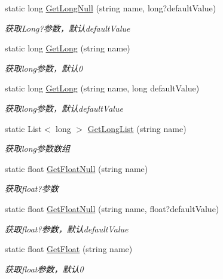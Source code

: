 \begin{DoxyCompactItemize}
static long \hyperlink{class_x_c_l_net_tools_1_1_string_hander_1_1_form_helper_a7e009fc6b804b15f2015d78ed3581677}{Get\-Long\-Null} (string name, long?default\-Value)
\begin{DoxyCompactList}\small\item\em 获取\-Long?参数，默认default\-Value \end{DoxyCompactList}\item 
static long \hyperlink{class_x_c_l_net_tools_1_1_string_hander_1_1_form_helper_a55353bd867fa827c8eb55a710df02cb1}{Get\-Long} (string name)
\begin{DoxyCompactList}\small\item\em 获取long参数，默认0 \end{DoxyCompactList}\item 
static long \hyperlink{class_x_c_l_net_tools_1_1_string_hander_1_1_form_helper_a51392713a245c7460bb5c823eb664ef8}{Get\-Long} (string name, long default\-Value)
\begin{DoxyCompactList}\small\item\em 获取long参数，默认default\-Value \end{DoxyCompactList}\item 
static List$<$ long $>$ \hyperlink{class_x_c_l_net_tools_1_1_string_hander_1_1_form_helper_ac00bef1db952ab0901c1813bbe193fa0}{Get\-Long\-List} (string name)
\begin{DoxyCompactList}\small\item\em 获取long参数数组 \end{DoxyCompactList}\item 
static float \hyperlink{class_x_c_l_net_tools_1_1_string_hander_1_1_form_helper_a6d0d3c455a9582ca4a4fa5bf4269deff}{Get\-Float\-Null} (string name)
\begin{DoxyCompactList}\small\item\em 获取float?参数 \end{DoxyCompactList}\item 
static float \hyperlink{class_x_c_l_net_tools_1_1_string_hander_1_1_form_helper_a4647a1a2655436ed24cc07f117109818}{Get\-Float\-Null} (string name, float?default\-Value)
\begin{DoxyCompactList}\small\item\em 获取float?参数，默认default\-Value \end{DoxyCompactList}\item 
static float \hyperlink{class_x_c_l_net_tools_1_1_string_hander_1_1_form_helper_a0807fb3fcdf5a5686fe0d8417013835a}{Get\-Float} (string name)
\begin{DoxyCompactList}\small\item\em 获取float参数，默认0 \end{DoxyCompactList}\item 

\end{DoxyCompactItemize}
